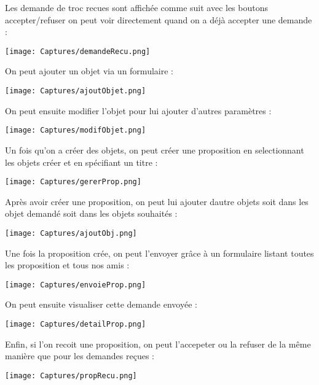 \documentclass{article}
\begin{document}
Les demande de troc recues sont affichée comme suit avec les boutons accepter/refuser on peut voir directement quand on a déjà accepter une demande :
\begin{center}
\texttt{[image: Captures/demandeRecu.png]}
\end{center}

On peut ajouter un objet via un formulaire :

\begin{center}
\texttt{[image: Captures/ajoutObjet.png]}
\end{center}

On peut ensuite modifier l'objet pour lui ajouter d'autres paramètres :

\begin{center}
\texttt{[image: Captures/modifObjet.png]}
\end{center}

Un fois qu'on a créer des objets, on peut créer une proposition en selectionnant les objets créer et en spécifiant un titre :

\begin{center}
\texttt{[image: Captures/gererProp.png]}
\end{center}

Après avoir créer une proposition, on peut lui ajouter dautre objets soit dans les objet demandé soit dans les objets souhaités :

\begin{center}
\texttt{[image: Captures/ajoutObj.png]}
\end{center}

Une fois la proposition crée, on peut l'envoyer grâce à un formulaire listant toutes les proposition et tous nos \og amis \fg{} :

\begin{center}
\texttt{[image: Captures/envoieProp.png]}
\end{center}

On peut ensuite visualiser cette demande envoyée :

\begin{center}
\texttt{[image: Captures/detailProp.png]}
\end{center}

Enfin, si l'on recoit une proposition, on peut l'accepeter ou la refuser de la même manière que pour les demandes reçues :

\begin{center}
\texttt{[image: Captures/propRecu.png]}
\end{center}
\end{document}
